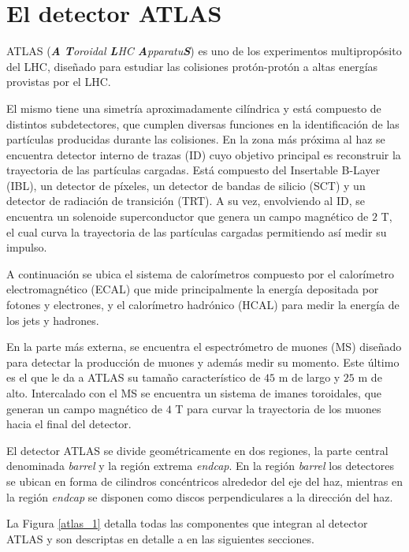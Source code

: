 \section{El detector ATLAS}


ATLAS (\textit{\textbf{A} \textbf{T}oroidal \textbf{L}HC \textbf{A}pparatu\textbf{S}})  \cite{PERF-2007-01} es uno de los experimentos multipropósito del LHC, diseñado para estudiar las colisiones protón-protón a altas energías provistas por el LHC.

El mismo tiene una simetría aproximadamente cilíndrica y está compuesto de distintos subdetectores, que cumplen diversas funciones en la identificación de las partículas producidas durante las colisiones. En la zona más próxima al haz se encuentra detector interno de trazas (ID) cuyo objetivo principal es reconstruir la trayectoria de las partículas cargadas. Está compuesto del Insertable B-Layer (IBL), un detector de píxeles, un detector de bandas de silicio (SCT) y un detector de radiación de transición (TRT). A su vez, envolviendo al ID, se encuentra un solenoide superconductor que genera un campo magnético de $2$ T, el cual curva la trayectoria de las partículas cargadas permitiendo así medir su impulso.

A continuación se ubica el sistema de calorímetros compuesto por el calorímetro electromagnético (ECAL) que mide principalmente la energía depositada por fotones y electrones, y el calorímetro hadrónico (HCAL) para medir la energía de los jets y hadrones.

En la parte más externa, se encuentra el espectrómetro de muones (MS) diseñado para detectar la producción de muones y además medir su momento. Este último es el que le da a ATLAS su tamaño característico de $45$ m de largo y $25$ m de alto. Intercalado con el MS se encuentra un sistema de imanes toroidales, que generan un campo magnético de $4$ T para curvar la trayectoria de los muones hacia el final del detector.

El detector ATLAS se divide geométricamente en dos regiones, la parte central denominada \textit{barrel} y la región extrema \textit{endcap}. En la región \textit{barrel} los detectores se ubican en forma de cilindros concéntricos alrededor del eje del haz, mientras en la región \textit{endcap} se disponen como discos perpendiculares a la dirección del haz. 

La Figura \ref{atlas_1} detalla todas las componentes que integran al detector ATLAS y son descriptas en detalle a en las siguientes secciones.

